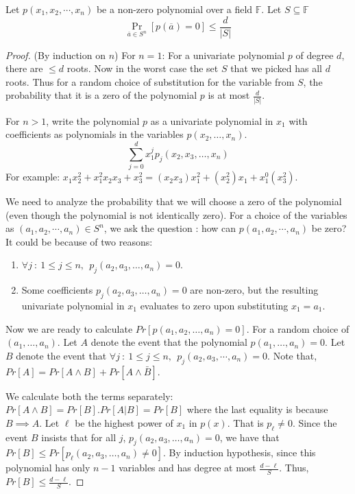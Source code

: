 \begin{lemma}
Let $p(x_1, x_2, \cdots , x_n)$ be a non-zero polynomial over a field
$\mathbb{F}$. Let $S\subseteq \mathbb{F}$
$$\Pr_{\overline{a} \in S^n}[p(\overline{a})=0]\leq \frac{d}{|S|}$$
\end{lemma}
\begin{proof}
(By induction on $n$) For $n=1$: For a univariate polynomial $p$ of
  degree $d$, there are $\leq d$ roots. Now in the worst case the set
  $S$ that we picked has all $d$ roots. Thus for a random choice of
  substitution for the variable from $S$, the probability that it is a zero of
  the polynomial $p$ is at most $\frac{d}{|S|}$.

For $n>1$, write the polynomial $p$ as a univariate polynomial in $x_1$ with coefficients as polynomials in the variables $p(x_2, \ldots, x_n)$.
$$ \displaystyle \sum_{j=0}^{d}x_1^jp_j(x_2, x_3, \ldots, x_n)$$
\noindent For example: $x_1x_2^2+x_1^2x_2x_3+x_3^2=(x_2x_3)x_1^2+(x_2^2)x_1+x_1^0(x_3^2)$.

We need to analyze the probability that we will choose a zero of the
polynomial (even though the polynomial is not identically zero). For a
choice of the variables as $(a_1, a_2, \cdots, a_n)\in S^n$, we ask
the question : how can $p(a_1, a_2, \cdots, a_n)$ be zero? It could be
because of two reasons:

\begin{enumerate}
\item $\forall j~:~1 \le j \le n , ~~ p_j(a_2, a_3, \ldots , a_n)=0$.
\item %
Some coefficients $p_j(a_2, a_3, \ldots , a_n)=0$ are non-zero, but
the resulting univariate polynomial in $x_1$ evaluates to zero upon
substituting $x_1 = a_1$.
\end{enumerate}

\noindent Now we are ready to calculate $Pr [ p(a_1, a_2, \ldots, a_n) = 0 ]$.
For a random choice of $(a_1, \ldots, a_n)$.
Let $A$ denote the event that the polynomial $p(a_1, \ldots, a_n) = 0$.
Let $B$ denote the event that $\forall j~:~1 \le j \le n ,~~p_j(a_2, a_3, \cdots , a_n)=0$.
Note that, $Pr[A] = Pr[A \land B]+Pr[A\land \bar{B}]$.

We calculate both the terms separately: $Pr[A \land B] = Pr[B].Pr[A|B]
= Pr[B]$ where the last equality is because $B \implies A$.  Let
$\ell$ be the highest power of $x_1$ in $p(x)$. That is $p_\ell \ne
0$. Since the event $B$ insists that for all $j$, $p_j(a_2, a_3,
\ldots , a_n)=0$, we have that $Pr[B] \leq Pr[p_\ell(a_2, a_3, \ldots, a_n) \ne 0]$.  By induction hypothesis, since this polynomial has
only $n-1$ variables and has degree at most $\frac{d -
  \ell}{S}$. Thus, $Pr[B] \le \frac{d - \ell}{S}$.


\end{proof}

